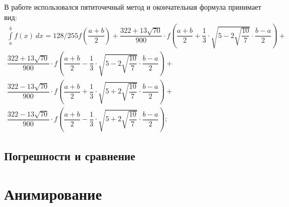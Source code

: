 В работе использовался пятиточечный метод и окончательная формула принимает вид:
\begin{equation}
\begin{split}
	\int\limits_a^b f(x)\,dx =  128/255 f(\dfrac{a+b}{2})+
  \dfrac{322+13\sqrt{70}}{900}\cdot f\left(\dfrac{a+b}{2} + \dfrac 13\cdot \sqrt{5-2\sqrt{\dfrac{10}{7}}}\cdot\dfrac{b-a}{2}\right) +\\
  \dfrac{322+13\sqrt{70}}{900}\cdot f\left(\dfrac{a+b}{2} - \dfrac 13\cdot \sqrt{5-2\sqrt{\dfrac{10}{7}}}\cdot\dfrac{b-a}{2}\right) +\\
  \dfrac{322-13\sqrt{70}}{900}\cdot f\left(\dfrac{a+b}{2} + \dfrac 13\cdot \sqrt{5+2\sqrt{\dfrac{10}{7}}}\cdot\dfrac{b-a}{2}\right) +\\
  \dfrac{322-13\sqrt{70}}{900}\cdot f\left(\dfrac{a+b}{2} - \dfrac 13\cdot \sqrt{5+2\sqrt{\dfrac{10}{7}}}\cdot\dfrac{b-a}{2}\right);
\end{split}
\end{equation}

\subsection{Погрешности и сравнение}

\section{Анимирование}
